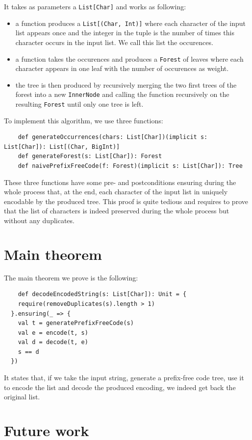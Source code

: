 \documentclass[a4paper,UKenglish,cleveref, autoref, thm-restate]{lipics-v2021}
\begin{document}
It takes as parameters a \lstinline{List[Char]} and works as following:
\begin{itemize}
    \item a function produces a \lstinline{List[(Char, Int)]} where each character of the input list appears once and the integer in the tuple is the number of times this character occurs in the input list. We call this list the occurences.
    \item a function takes the occurences and produces a \lstinline{Forest} of leaves where each character appears in one leaf with the number of occurences as weight.
    \item the tree is then produced by recursively merging the two first trees of the forest into a new \lstinline{InnerNode} and calling the function recursively on the resulting \lstinline{Forest} until only one tree is left.
\end{itemize}

To implement this algorithm, we use three functions:
\begin{lstlisting}
    def generateOccurrences(chars: List[Char])(implicit s: List[Char]): List[(Char, BigInt)]
    def generateForest(s: List[Char]): Forest
    def naivePrefixFreeCode(f: Forest)(implicit s: List[Char]): Tree
\end{lstlisting}

These three functions have some pre- and postconditions ensuring during the whole process that, at the end, each character of the input list in uniquely encodable by the produced tree.
This proof is quite tedious and requires to prove that the list of characters is indeed preserved during the whole process but without any duplicates.

\section{Main theorem}
The main theorem we prove is the following:
\begin{lstlisting}
    def decodeEncodedString(s: List[Char]): Unit = {
    require(removeDuplicates(s).length > 1)
  }.ensuring(_ => {
    val t = generatePrefixFreeCode(s)
    val e = encode(t, s)
    val d = decode(t, e)
    s == d
  })
\end{lstlisting}

It states that, if we take the input string, generate a prefix-free code tree, use it to encode the list and decode the produced encoding, we indeed get back the original list.

\section{Future work}
\end{document}
